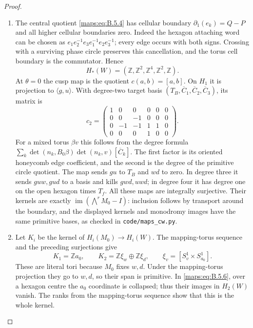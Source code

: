\begin{proof}
\begin{enumerate}[label=\arabic*.,leftmargin=*]
\item The central quotient \eqref{maps:eq:B.5.4} has cellular boundary
$\partial_1(e_k)=Q-P$ and all higher cellular
boundaries zero.  Indeed the hexagon attaching word
can be chosen as
$e_1e_2^{-1}e_3e_1^{-1}e_2e_3^{-1}$; every edge occurs
with both signs.  Crossing with a surviving phase
circle preserves this cancellation, and the torus
cell boundary is the commutator.  Hence
\[
 H_*(W)=(\mathbb Z,\mathbb Z^2,\mathbb Z^4,
                       \mathbb Z^2,\mathbb Z).
\]
At $\theta=0$ the cusp map is the quotient
$c(a,b)=[a,b]$.  On $H_1$ it is projection to
$\langle g,u\rangle$.  With degree-two target basis
$(T_B,\overline C_1,\overline C_2,\overline C_3)$,
its matrix is
\[
 c_2=\begin{pmatrix}
 1&0&0&0&0&0\\0&0&-1&0&0&0\\
 0&-1&-1&1&1&0\\0&0&0&1&0&0
 \end{pmatrix}.
 \tag{B.5.16}\label{maps:eq:B.5.16}
\]
For a mixed torus $\beta v$ this follows from the
degree formula
$\sum_k\det(n_k,B_0\beta)\det(n_k,v)[\overline C_k]$.
The first factor is its oriented honeycomb edge
coefficient, and the second is the degree of the
primitive circle quotient.  The map sends $gu$ to
$T_B$ and $wd$ to zero.  In degree three it sends
$guw,gud$ to a basis and kills $gwd,uwd$; in degree
four it has degree one on the open hexagon times
$T_f$.  All these maps are integrally surjective.
Their kernels are exactly
$\operatorname{im}(\bigwedge^r M_0-I)$: inclusion
follows by transport around the boundary, and the
displayed kernels and monodromy images have the
same primitive bases, as checked in
\texttt{code/maps\_cw.py}.

\item Let $K_i$ be the kernel of $H_i(M_0)\to H_i(W)$.
The mapping-torus sequence and the preceding
surjections give
\[
 K_1=\mathbb Z a_0,\qquad
 K_2=\mathbb Z\xi_w\oplus\mathbb Z\xi_d,
 \qquad \xi_v=[S^1_v\times S^1_{a_0}].
 \tag{B.5.17}\label{maps:eq:B.5.17}
\]
These are literal tori because $M_0$ fixes $w,d$.
Under the mapping-torus projection they go to $w,d$,
so their span is primitive.  In \eqref{maps:eq:B.5.6}, over a
hexagon centre the $a_0$ coordinate is collapsed;
thus their images in $H_2(W)$ vanish.  The ranks
from the mapping-torus sequence show that this is
the whole kernel.


\end{enumerate}
\end{proof}

